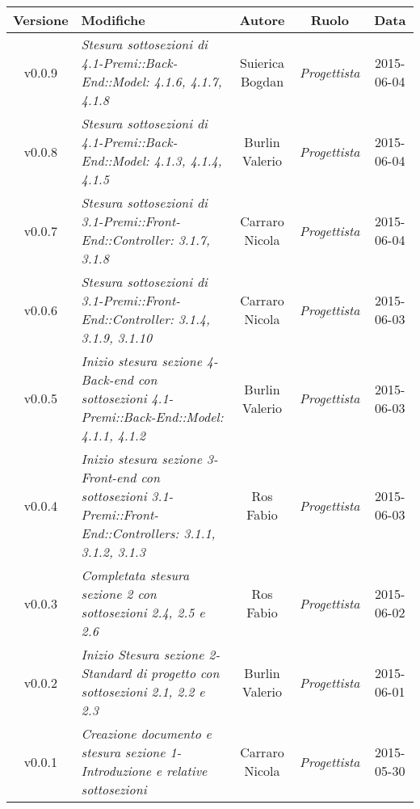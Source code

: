 \begin{table}[h]
	\centering
	\begin{tabular}{|c|p{}|c|c|c|}
		\toprule
		\textbf{Versione} & \textbf{Modifiche} & \textbf{Autore} & \textbf{Ruolo} & \textbf{Data}\\
		\midrule
		\midrule
			v0.0.9 & \textit{Stesura sottosezioni di 4.1-Premi::Back-End::Model: 4.1.6, 4.1.7, 4.1.8} & Suierica Bogdan & \textit{Progettista} & 2015-06-04\\
		\midrule
			v0.0.8 & \textit{Stesura sottosezioni di 4.1-Premi::Back-End::Model: 4.1.3, 4.1.4, 4.1.5} & Burlin Valerio & \textit{Progettista} & 2015-06-04\\
		\midrule
			v0.0.7 & \textit{Stesura sottosezioni di 3.1-Premi::Front-End::Controller: 3.1.7, 3.1.8} & Carraro Nicola & \textit{Progettista} & 2015-06-04\\
		\midrule
			v0.0.6 & \textit{Stesura sottosezioni di 3.1-Premi::Front-End::Controller: 3.1.4, 3.1.9, 3.1.10} & Carraro Nicola & \textit{Progettista} & 2015-06-03\\
		\midrule
			v0.0.5 & \textit{Inizio stesura sezione 4-Back-end con sottosezioni 4.1-Premi::Back-End::Model: 4.1.1, 4.1.2} & Burlin Valerio & \textit{Progettista} & 2015-06-03\\
		\midrule
			v0.0.4 & \textit{Inizio stesura sezione 3-Front-end con sottosezioni 3.1-Premi::Front-End::Controllers: 3.1.1, 3.1.2, 3.1.3} & Ros Fabio & \textit{Progettista} & 2015-06-03\\
		\midrule
			v0.0.3 & \textit{Completata stesura sezione 2 con sottosezioni 2.4, 2.5 e 2.6} & Ros Fabio & \textit{Progettista} & 2015-06-02\\
		\midrule
			v0.0.2 & \textit{Inizio Stesura sezione 2-Standard di progetto con sottosezioni 2.1, 2.2 e 2.3} & Burlin Valerio & \textit{Progettista} & 2015-06-01\\
		\midrule
			v0.0.1 & \textit{Creazione documento e stesura sezione 1-Introduzione e relative sottosezioni} & Carraro Nicola & \textit{Progettista} & 2015-05-30\\
		\bottomrule
	\end{tabular}
\end{table}

\newpage